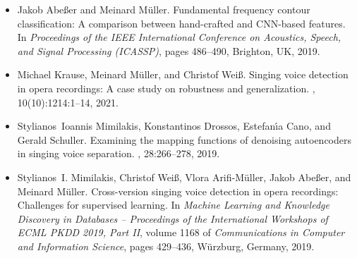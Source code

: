 \documentclass[11pt,a4paper]{article}
\theoremstyle{plain} \newtheorem{define}{Definition}[section]
\begin{document}
{{\begin{itemize}

\item
[\cite{AbesserMueller19_ContourClassification_ICASSP}]
Jakob Abe{\ss}er and Meinard M{\"u}ller.
\newblock Fundamental frequency contour classification: {A} comparison between
  hand-crafted and {CNN}-based features.
\newblock In {\em Proceedings of the {IEEE} International Conference on
  Acoustics, Speech, and Signal Processing ({ICASSP})}, pages 486--490,
  Brighton, {UK}, 2019.


\item
[\cite{KrauseMW21_OperaSingingActivity_Electronics}]
Michael Krause, Meinard M{\"u}ller, and Christof Wei{\ss}.
\newblock Singing voice detection in opera recordings: A case study on
  robustness and generalization.
, 10(10):1214:1--14, 2021.

\item
[\cite{MimilakisDCS19_DenoisingAutoencoders_TASLP}]
Stylianos~Ioannis Mimilakis, Konstantinos Drossos, Estefan{\'{\i}}a Cano, and
  Gerald Schuller.
\newblock Examining the mapping functions of denoising autoencoders in singing
  voice separation.
, 28:266--278, 2019.
  
\item
[\cite{MimilakisWAAM19_SingingVDetWagner_MML}]
Stylianos~I. Mimilakis, Christof Wei{\ss}, Vlora Arifi-M{\"u}ller, Jakob Abe{\ss}er, and Meinard M{\"u}ller.
\newblock Cross-version singing voice detection in opera recordings:
  {C}hallenges for supervised learning.
\newblock In {\em Machine Learning and Knowledge Discovery in Databases --
  Proceedings of the International Workshops of {ECML} {PKDD} 2019, Part {II}},
  volume 1168 of {\em Communications in Computer and Information Science},
  pages 429--436, W{\"u}rzburg, Germany, 2019.


\end{itemize}}}
\end{document}
